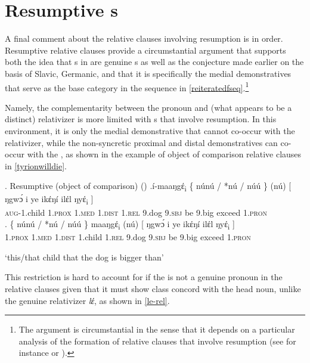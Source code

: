 \section{Resumptive s}

 A final comment about the  relative clauses involving resumption is in order. Resumptive relative clauses provide a circumstantial argument that supports both the idea that s in  are genuine s as well as the conjecture made earlier on the basis of Slavic, Germanic, and  that it is specifically the medial demonstratives that serve as the base category in the  sequence in \ref{reiteratedfseq}.\footnote{The argument is circumstantial in the sense that it depends on a particular analysis of the formation of relative clauses that involve resumption (see for instance \citeauthor{Bianchi2004} \citeyear{Bianchi2004,Bianchi2011} or \citealt[chapters 2--3]{Salzmann2017}).
} %
\par
Namely, the complementarity between the  pronoun and (what appears to be a distinct) relativizer is more limited with s that involve resumption. In this environment, it is only the medial demonstrative that cannot co-occur with the relativizer, while the non-syncretic proximal and distal demonstratives can co-occur with the , as shown in the example of object of comparison relative clauses in \ref{tyrionwilldie}.

\ex.\label{tyrionwilldie} Resumptive (object of comparison)  (\citealt[27]{Jenks-etall})
\ag.\'i-maaŋgέ\textsubscript{i} \{ n\'un\'u / *n\'u / {n\'u\'u \}} (n\'u) [ ŋgwɔ́ i ye ikέŋ\'i ilέl {ŋyέ\textsubscript{i} ]}\\
\textsc{aug}-1.child {} 1.\textsc{prox} {} \phantom{t}\textsc{1.med} {} {1.\textsc{dist}}
\phantom{l}\textsc{1.rel} {} 9.dog 9.\textsc{sbj} be 9.big exceed {1.\textsc{pron}}\\
\bg.  \{ n\'un\'u / *n\'u / {n\'u\'u \}} maaŋgέ\textsubscript{i} (n\'u) [ ŋgwɔ́ i ye ikέŋ\'i ilέl {ŋyέ\textsubscript{i} ]}\\
 {} 1.\textsc{prox} {} \phantom{t}\textsc{1.med} {} {1.\textsc{dist}} 1.child \phantom{t}\textsc{1.rel} {} 9.dog 9.\textsc{sbj} be 9.big exceed {1.\textsc{pron}}\\
\strut `this/that child that the dog is bigger than' 

This restriction is hard to account for if the  is not a genuine  pronoun in the  relative clauses given that it must show class concord with the head noun, unlike the genuine relativizer \textit{lέ}, as shown in \ref{le-rel}.


